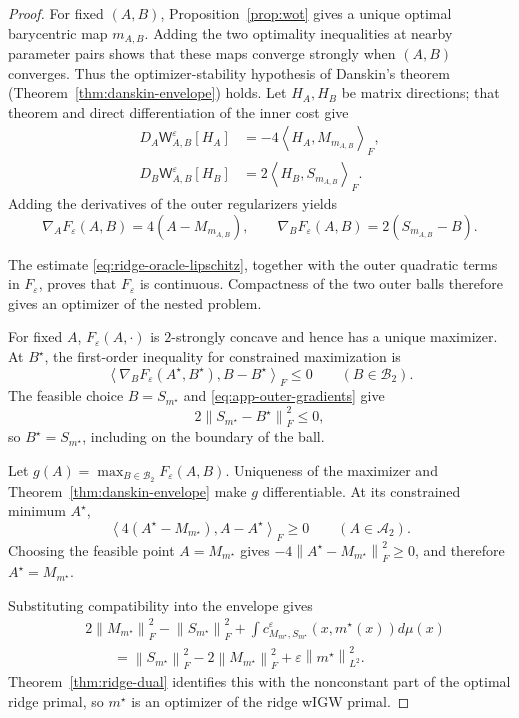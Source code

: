 \documentclass[11pt]{article}
\newcommand{\ip}[2]{\left\langle #1,#2\right\rangle}
\newcommand{\norm}[1]{\left\lVert #1\right\rVert}
\theoremstyle{plain}
\theoremstyle{definition}
\theoremstyle{remark}
\begin{document}
\begin{proof}
For fixed $(A,B)$, Proposition~\ref{prop:wot} gives a unique optimal barycentric
map $m_{A,B}$. Adding the two optimality inequalities at nearby parameter pairs
shows that these maps converge strongly when $(A,B)$ converges. Thus the
optimizer-stability hypothesis of Danskin's theorem
(Theorem~\ref{thm:danskin-envelope}) holds. Let $H_A,H_B$ be matrix directions;
that theorem and direct
differentiation of the inner cost give
\begin{align*}
 D_A\mathsf W_{A,B}^\varepsilon[H_A]
 &=-4\ip{H_A}{M_{m_{A,B}}}_F,\\
 D_B\mathsf W_{A,B}^\varepsilon[H_B]
 &=2\ip{H_B}{S_{m_{A,B}}}_F.
\end{align*}
Adding the derivatives of the outer regularizers yields
\begin{equation}\label{eq:app-outer-gradients}
 \nabla_AF_\varepsilon(A,B)=4(A-M_{m_{A,B}}),\qquad
 \nabla_BF_\varepsilon(A,B)=2(S_{m_{A,B}}-B).
\end{equation}

The estimate \eqref{eq:ridge-oracle-lipschitz}, together with the outer
quadratic terms in $F_\varepsilon$, proves that $F_\varepsilon$ is continuous.
Compactness of the two outer balls therefore gives an optimizer of the
nested problem.

For fixed $A$, $F_\varepsilon(A,\cdot)$ is $2$-strongly concave and hence has a
unique maximizer.  At $B^\star$, the first-order inequality for constrained
maximization is
\[
 \ip{\nabla_BF_\varepsilon(A^\star,B^\star)}{B-B^\star}_F\le0
 \qquad(B\in\mathcal B_2).
\]
The feasible choice $B=S_{m^\star}$ and \eqref{eq:app-outer-gradients} give
\[
 2\norm{S_{m^\star}-B^\star}_F^2\le0,
\]
so $B^\star=S_{m^\star}$, including on the boundary of the ball.

Let $g(A)=\max_{B\in\mathcal B_2}F_\varepsilon(A,B)$.  Uniqueness of the
maximizer and Theorem~\ref{thm:danskin-envelope} make $g$ differentiable.  At its constrained
minimum $A^\star$,
\[
 \ip{4(A^\star-M_{m^\star})}{A-A^\star}_F\ge0
 \qquad(A\in\mathcal A_2).
\]
Choosing the feasible point $A=M_{m^\star}$ gives
$-4\norm{A^\star-M_{m^\star}}_F^2\ge0$, and therefore
$A^\star=M_{m^\star}$.

Substituting compatibility into the envelope gives
\begin{align*}
 &2\norm{M_{m^\star}}_F^2-\norm{S_{m^\star}}_F^2
 +\int c_{M_{m^\star},S_{m^\star}}^\varepsilon
       (x,m^\star(x))d\mu(x)\\
 &\qquad=\norm{S_{m^\star}}_F^2-2\norm{M_{m^\star}}_F^2
 +\varepsilon\norm{m^\star}_{L^2}^2.
\end{align*}
Theorem~\ref{thm:ridge-dual} identifies this with the nonconstant part of the
optimal ridge primal, so $m^\star$ is an optimizer of the ridge wIGW primal.


\end{proof}
\end{document}
